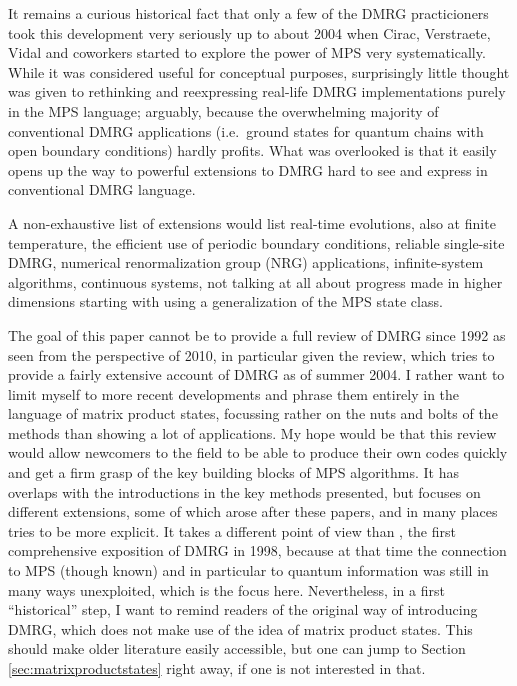 \documentclass[a4paper,10pt,oneside,onecolumn,1p,times]{elsarticle}
\begin{document}
It remains a curious historical fact that only a few of the DMRG practicioners took this development very seriously up to about 2004 when Cirac, Verstraete, Vidal and coworkers started to explore the power of MPS very systematically. While it was considered useful for conceptual purposes, surprisingly little thought was given to rethinking and reexpressing real-life DMRG implementations purely in the  MPS language; arguably, because the overwhelming majority of conventional DMRG applications (i.e.\ ground states for quantum chains with open boundary conditions) hardly profits. What was overlooked is that it easily opens up the way to powerful extensions to DMRG hard to see and express in conventional DMRG language. 

A non-exhaustive list of extensions would list real-time evolutions\cite{Vidal03a,Vidal04b,Daley04,WhiteFeiguin04,VerstraeteRipoll04,Prosen09,Hartmann09,Banuls09}, also at finite temperature\cite{VerstraeteRipoll04,Feiguin05a}, the efficient use of periodic boundary conditions\cite{VerstraetePorras04,Pippan10,Pirvu10}, reliable single-site DMRG\cite{White05}, numerical renormalization group (NRG) applications\cite{Weichselbaum09},  infinite-system algorithms\cite{Vidal07,Orus08,McCulloch08}, continuous systems\cite{Verstraete10}, not talking at all about progress made in higher dimensions starting with \cite{VerstraeteCirac04} using a generalization of the MPS state class\cite{Nishino01}. 

The goal of this paper cannot be to provide a full review of DMRG since 1992 as seen from the perspective of 2010, in particular given the review\cite{Schollwoeck05}, which tries to provide a fairly extensive account of DMRG as of summer 2004. I rather want to limit myself to more recent developments and phrase them entirely in the language of matrix product states, focussing rather on the nuts and bolts of the methods than showing a lot of applications. My hope would be that this review would allow newcomers to the field to be able to produce their own codes quickly and get a firm grasp of the key building blocks of MPS algorithms. It has overlaps with the introductions \cite{VerstraeteMurg08,McCulloch07} in the key methods presented, but focuses on different extensions, some of which arose after these papers, and in many places tries to be more explicit. It takes a different point of view than \cite{Peschel98}, the first comprehensive exposition of DMRG in 1998, because at that time the connection to MPS (though known) and in particular to quantum information was still in many ways unexploited, which is the focus here. Nevertheless, in a first ``historical'' step, I want to remind readers of the original way of introducing DMRG, which does not make use of the idea of matrix product states. This should make older literature easily accessible, but one can jump to Section \ref{sec:matrixproductstates} right away, if one is not interested in that. 
 
\end{document}
